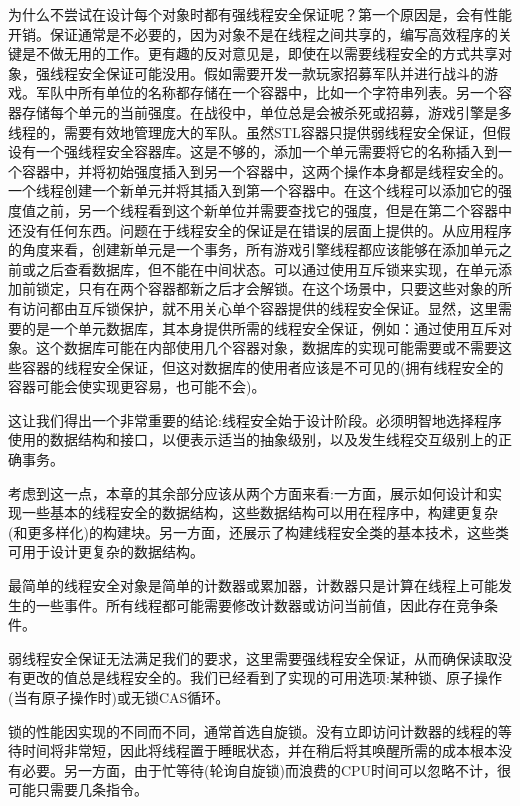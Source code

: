 为什么不尝试在设计每个对象时都有强线程安全保证呢？第一个原因是，会有性能开销。保证通常是不必要的，因为对象不是在线程之间共享的，编写高效程序的关键是不做无用的工作。更有趣的反对意见是，即使在以需要线程安全的方式共享对象，强线程安全保证可能没用。假如需要开发一款玩家招募军队并进行战斗的游戏。军队中所有单位的名称都存储在一个容器中，比如一个字符串列表。另一个容器存储每个单元的当前强度。在战役中，单位总是会被杀死或招募，游戏引擎是多线程的，需要有效地管理庞大的军队。虽然STL容器只提供弱线程安全保证，但假设有一个强线程安全容器库。这是不够的，添加一个单元需要将它的名称插入到一个容器中，并将初始强度插入到另一个容器中，这两个操作本身都是线程安全的。一个线程创建一个新单元并将其插入到第一个容器中。在这个线程可以添加它的强度值之前，另一个线程看到这个新单位并需要查找它的强度，但是在第二个容器中还没有任何东西。问题在于线程安全的保证是在错误的层面上提供的。从应用程序的角度来看，创建新单元是一个事务，所有游戏引擎线程都应该能够在添加单元之前或之后查看数据库，但不能在中间状态。可以通过使用互斥锁来实现，在单元添加前锁定，只有在两个容器都新之后才会解锁。在这个场景中，只要这些对象的所有访问都由互斥锁保护，就不用关心单个容器提供的线程安全保证。显然，这里需要的是一个单元数据库，其本身提供所需的线程安全保证，例如：通过使用互斥对象。这个数据库可能在内部使用几个容器对象，数据库的实现可能需要或不需要这些容器的线程安全保证，但这对数据库的使用者应该是不可见的(拥有线程安全的容器可能会使实现更容易，也可能不会)。

这让我们得出一个非常重要的结论:线程安全始于设计阶段。必须明智地选择程序使用的数据结构和接口，以便表示适当的抽象级别，以及发生线程交互级别上的正确事务。

考虑到这一点，本章的其余部分应该从两个方面来看:一方面，展示如何设计和实现一些基本的线程安全的数据结构，这些数据结构可以用在程序中，构建更复杂(和更多样化)的构建块。另一方面，还展示了构建线程安全类的基本技术，这些类可用于设计更复杂的数据结构。


最简单的线程安全对象是简单的计数器或累加器，计数器只是计算在线程上可能发生的一些事件。所有线程都可能需要修改计数器或访问当前值，因此存在竞争条件。

弱线程安全保证无法满足我们的要求，这里需要强线程安全保证，从而确保读取没有更改的值总是线程安全的。我们已经看到了实现的可用选项:某种锁、原子操作(当有原子操作时)或无锁CAS循环。

锁的性能因实现的不同而不同，通常首选自旋锁。没有立即访问计数器的线程的等待时间将非常短，因此将线程置于睡眠状态，并在稍后将其唤醒所需的成本根本没有必要。另一方面，由于忙等待(轮询自旋锁)而浪费的CPU时间可以忽略不计，很可能只需要几条指令。

